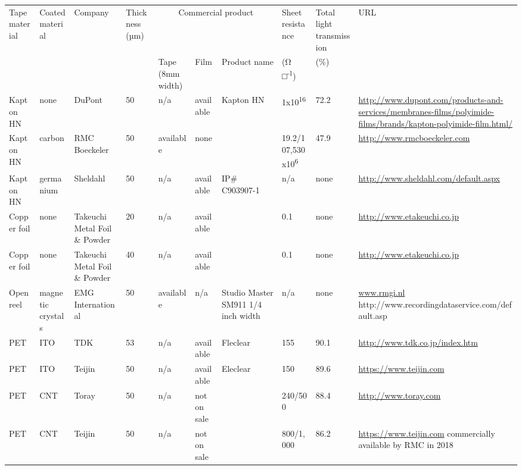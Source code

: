 \documentclass{article}
\begin{document}
{\scriptsize\setlength{\tabcolsep}{2pt}
\begin{longtable}{p{1.0cm}p{1.1cm}p{1.4cm}p{0.8cm}p{1.0cm}p{0.9cm}p{1.5cm}p{1.3cm}p{1.1cm}>{\raggedright\arraybackslash}p{3.6cm}}
\toprule
Tape material & Coated material & Company & Thickness (µm) & \multicolumn{3}{c}{Commercial product} & Sheet resistance & Total light transmission & URL \\
 & & & & Tape (8mm width) & Film & Product name & (Ω □\textsuperscript{-1}) & (\%) & \\ \midrule
Kapton HN & none & DuPont & 50 & n/a & available & Kapton HN & 1x10\textsuperscript{16} & 72.2 & \url{http://www.dupont.com/products-and-services/membranes-films/polyimide-films/brands/kapton-polyimide-film.html/} \\
Kapton HN & carbon & RMC Boeckeler & 50 & available & none &  & 19.2/107\newline 6,530x10\textsuperscript{6} & 47.9 & \url{http://www.rmcboeckeler.com} \\
Kapton HN & germanium & Sheldahl & 50 & n/a & available & IP\# C903907-1 & n/a & none & \url{http://www.sheldahl.com/default.aspx} \\
Copper foil & none & Takeuchi Metal Foil \& Powder & 20 & n/a & available &  & 0.1 & none & \url{http://www.etakeuchi.co.jp} \\
Copper foil & none & Takeuchi Metal Foil \& Powder & 40 & n/a & available &  & 0.1 & none & \url{http://www.etakeuchi.co.jp} \\
Open reel & magnetic crystals & EMG International & 50 & available & n/a & Studio Master SM911 1/4 inch width & n/a & none & \url{www.rmgi.nl} http://www.recordingdataservice.com/default.asp \\
PET & ITO & TDK & 53 & n/a & available & Fleclear & 155 & 90.1 & \url{http://www.tdk.co.jp/index.htm} \\
PET & ITO & Teijin & 50 & n/a & available & Eleclear & 150 & 89.6 & \url{https://www.teijin.com} \\
PET & CNT & Toray & 50 & n/a & not on sale &  & 240/500 & 88.4 & \url{http://www.toray.com} \\
PET & CNT & Teijin & 50 & n/a & not on sale &  & 800/1,000 & 86.2 & \url{https://www.teijin.com} commercially available by RMC in 2018 \\
\bottomrule
\end{longtable}}
\end{document}
